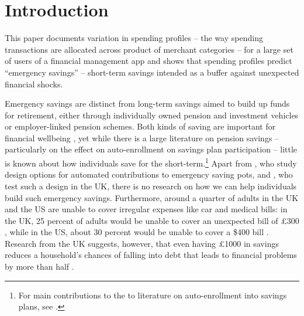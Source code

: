 
\section{Introduction}%
\label{sec:introduction}

This paper documents variation in spending profiles -- the way spending
transactions are allocated across product of merchant categories -- for a large
set of users of a financial management app and shows that spending profiles
predict ``emergency savings'' -- short-term savings intended as a buffer
against unexpected financial shocks.

Emergency savings are distinct from long-term savings aimed to build up funds
for retirement, either through individually owned pension and investment
vehicles or employer-linked pension schemes. Both kinds of saving are important
for financial wellbeing \citep{mps2018building, cfpb2017financial}, yet while
there is a large literature on pension savings -- particularly on the effect on
auto-enrollment on savings plan participation -- little is known about how
individuals save for the short-term.\footnote{For main contributions to the to
literature on auto-enrollment into savings plans, see \citet{madrian2001power,
choi2002defined, choi2004better, beshears2009importance}.} Apart from
\citet{beshears2020building}, who study design options for automated
contributions to emergency saving pots, and \citet{phillips2021supporting}, who
test such a design in the UK, there is no research on how we can help
individuals build such emergency savings. Furthermore, around a quarter of
adults in the UK and the US are unable to cover irregular expenses like car and
medical bills: in the UK, 25 percent of adults would be unable to cover an
unexpected bill of \pounds300 \citep{phillips2021supporting}, while in the US,
about 30 percent would be unable to cover a \$400 bill \citep{fed2022economic}.
Research from the UK suggests, however, that even having \pounds1000 in savings
reduces a household's chances of falling into debt that leads
to financial problems by more than half \citep{phillips2021supporting}.

